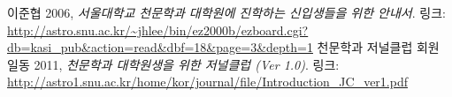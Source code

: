\begin{thebibliography}{9}
 이준협 2006, \emph{서울대학교 천문학과 대학원에 진학하는 신입생들을 위한 안내서}. 링크: \url{http://astro.snu.ac.kr/~jhlee/bin/ez2000b/ezboard.cgi?db=kasi_pub&action=read&dbf=18&page=3&depth=1}
 천문학과 저널클럽 회원 일동 2011, \emph{천문학과 대학원생을 위한 저널클럽 (Ver 1.0)}. 링크: \url{http://astro1.snu.ac.kr/home/kor/journal/file/Introduction_JC_ver1.pdf}
\end{thebibliography}